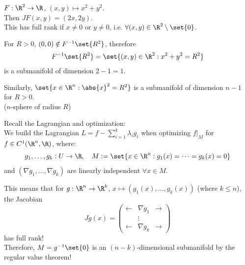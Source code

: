 \begin{example*}
$F: \R^2 \to \R$, $(x,y) \mapsto x^2 + y^2$. \\
Then $JF(x,y) = (2x, 2y)$. \\
This has full rank if $x \ne 0$ or $y \ne 0$, i.e. $\forall (x,y) \in \R^2 \setminus \set{0}$.

For $R > 0$, $(0,0) \notin F^{-1}\set{R^2}$, therefore
\[ F^{-1}\set{R^2} = \set{(x,y) \in \R^2 : x^2 + y^2 = R^2} \]
is a submanifold of dimension $2 - 1 = 1$.

\begin{center}
\end{center}

Similarly, $\set{x \in \R^n : \abs{x}^2 = R^2}$ is a submanifold of dimension $n-1$ for $R > 0$. \\
\textcolor{eGray}{($n$-sphere of radius $R$)} 
\end{example*}

\textcolor{eGray}{Recall the Lagrangian and optimization:} \\
We build the Lagrangian $L = f - \sum_{i=1}^k \lambda_i g_i$ when optimizing $f|_M$ for $f \in C^1(\R^n, \R)$, where:
\[ g_1, \dots, g_k: U \to \R, \quad M := \set{x \in \R^n : g_1(x) = \dots = g_k(x) = 0} \]
and $(\nabla g_1, \dots, \nabla g_k)$ are linearly independent $\forall x \in M$.

This means that for $g: \R^n \to \R^k$, $x \mapsto (g_1(x), \dots, g_k(x))$ (where $k \le n$), the Jacobian
\[ Jg(x) = \begin{pmatrix} \longleftarrow & \nabla g_1 & \longrightarrow \\ & \vdots & \\ \longleftarrow & \nabla g_k & \longrightarrow \end{pmatrix} \]
has full rank! \\
Therefore, $M = g^{-1}\set{0}$ is an $(n-k)$-dimensional submanifold by the regular value theorem!

